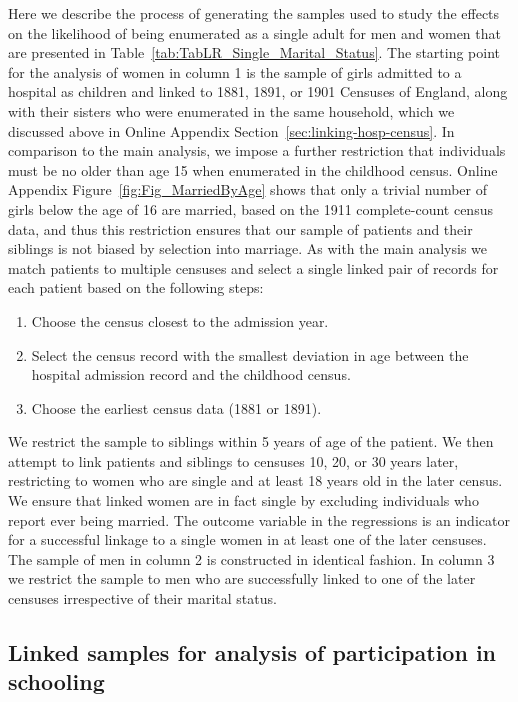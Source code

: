 \documentclass[12pt,english]{article}
\begin{document}
Here we describe the process of generating the samples used to study the effects on the likelihood of being enumerated as a single adult for men and women that are presented in Table~\ref{tab:TabLR_Single_Marital_Status}. The starting point for the analysis of women in column 1 is the sample of girls admitted to a hospital as children and linked to 1881, 1891, or 1901 Censuses of England, along with their sisters who were enumerated in the same household, which we discussed above in Online Appendix Section~\ref{sec:linking-hosp-census}. In comparison to the main analysis, we impose a further restriction that individuals must be no older than age 15 when enumerated in the childhood census. Online Appendix Figure~\ref{fig:Fig_MarriedByAge} shows that only a trivial number of girls below the age of 16 are married, based on the 1911 complete-count census data, and thus this restriction ensures that our sample of patients and their siblings is not biased by selection into marriage. As with the main analysis we match patients to multiple censuses and select a single linked pair of records for each patient based on the following steps:
\begin{enumerate}
    \item Choose the census closest to the admission year.
    \item Select the census record with the smallest deviation in age between the hospital admission record and the childhood census.
    \item Choose the earliest census data (1881 or 1891).
\end{enumerate}
\noindent We restrict the sample to siblings within 5 years of age of the patient. We then attempt to link patients and siblings to censuses 10, 20, or 30 years later, restricting to women who are single and at least 18 years old in the later census. We ensure that linked women are in fact single by excluding individuals who report ever being married. The outcome variable in the regressions is an indicator for a successful linkage to a single women in at least one of the later censuses. The sample of men in column 2 is constructed in identical fashion. In column 3 we restrict the sample to men who are successfully linked to one of the later censuses irrespective of their marital status.

\subsection{Linked samples for analysis of participation in schooling\label{sec:linking-schooling}}
\end{document}
